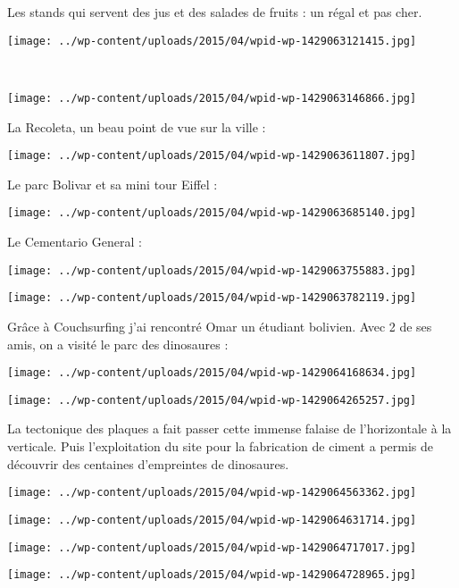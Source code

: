   Les stands qui servent des jus et des salades de fruits : un régal et pas cher. 
\begin{center} \texttt{[image: ../wp-content/uploads/2015/04/wpid-wp-1429063121415.jpg]} \end{center}
\vspace{-\topsep}

\pagebreak
~
\begin{center} \texttt{[image: ../wp-content/uploads/2015/04/wpid-wp-1429063146866.jpg]} \end{center}

 La Recoleta, un beau point de vue sur la ville :
\begin{center} \texttt{[image: ../wp-content/uploads/2015/04/wpid-wp-1429063611807.jpg]} \end{center}
\vspace{-\topsep}

\pagebreak
 Le parc Bolivar et sa mini tour Eiffel :
\begin{center} \texttt{[image: ../wp-content/uploads/2015/04/wpid-wp-1429063685140.jpg]} \end{center}

 Le Cementario General :
\begin{center} \texttt{[image: ../wp-content/uploads/2015/04/wpid-wp-1429063755883.jpg]} \end{center}
\begin{center} \texttt{[image: ../wp-content/uploads/2015/04/wpid-wp-1429063782119.jpg]} \end{center}

 Grâce à Couchsurfing j'ai rencontré Omar un étudiant bolivien. Avec 2 de ses amis, on a visité le parc des dinosaures :
\begin{center} \texttt{[image: ../wp-content/uploads/2015/04/wpid-wp-1429064168634.jpg]} \end{center}
\begin{center} \texttt{[image: ../wp-content/uploads/2015/04/wpid-wp-1429064265257.jpg]} \end{center}

 La tectonique des plaques a fait passer cette immense falaise de l'horizontale à la verticale. Puis l'exploitation du site pour la fabrication de ciment a permis de découvrir des centaines d'empreintes de dinosaures. 
\begin{center} \texttt{[image: ../wp-content/uploads/2015/04/wpid-wp-1429064563362.jpg]} \end{center}
\begin{center} \texttt{[image: ../wp-content/uploads/2015/04/wpid-wp-1429064631714.jpg]} \end{center}
\begin{center} \texttt{[image: ../wp-content/uploads/2015/04/wpid-wp-1429064717017.jpg]} \end{center}
\begin{center} \texttt{[image: ../wp-content/uploads/2015/04/wpid-wp-1429064728965.jpg]} \end{center}